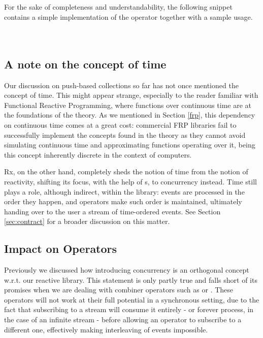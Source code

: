 For the sake of completeness and understandability, the following snippet contains a simple implementation of the  operator together with a sample usage.\\

\\

\\


\subsection{A note on the concept of time}

Our discussion on push-based collections so far has not once mentioned the concept of time. This might appear strange, especially to the reader familiar with Functional Reactive Programming, where functions over continuous time are at the foundations of the theory. As we mentioned in Section \ref{frp}, this dependency on continuous time comes at a great cost: commercial FRP libraries fail to successfully implement the concepts found in the theory as they cannot avoid simulating continuous time and approximating functions operating over it, being this concept inherently discrete in the context of computers.

Rx, on the other hand, completely sheds the notion of time from the notion of reactivity\cite{meijer2010observable}, shifting its focus, with the help of s, to concurrency instead. Time still plays a role, although indirect, within the library: events are processed in the order they happen, and operators make such order is maintained, ultimately handing over to the user a stream of time-ordered events. See Section \ref{sec:contract} for a broader discussion on this matter.

\subsection{Impact on Operators}

Previously we discussed how introducing concurrency is an orthogonal concept w.r.t. our reactive library. This statement is only partly true and falls short of its promises when we are dealing with combiner operators such as \code{(>>=)} or . These operators will not work at their full potential in a synchronous setting, due to the fact that subscribing to a stream will consume it entirely - or forever process, in the case of an infinite stream - before allowing an operator to subscribe to a different one, effectively making interleaving of events impossible.

